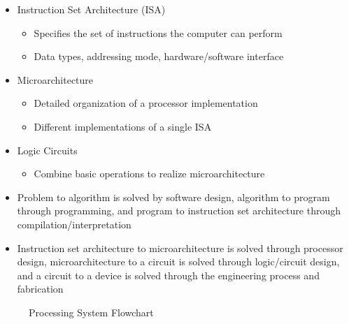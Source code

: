 \begin{itemize}
\begin{itemize}
\begin{itemize}
        \end{itemize}

      \item Instruction Set Architecture (ISA)

        \begin{itemize}

          \item Specifies the set of instructions the computer can perform

          \item Data types, addressing mode, hardware/software interface

        \end{itemize}

      \item Microarchitecture

        \begin{itemize}

          \item Detailed organization of a processor implementation

          \item Different implementations of a single ISA

        \end{itemize}

      \item Logic Circuits

        \begin{itemize}

          \item Combine basic operations to realize microarchitecture

        \end{itemize}

      \item Problem to algorithm is solved by software design, algorithm to program through programming, and program to instruction set architecture through compilation/interpretation

      \item Instruction set architecture to microarchitecture is solved through processor design, microarchitecture to a circuit is solved through logic/circuit design, and a circuit to a device is solved through the engineering process and fabrication

    \end{itemize}

    \begin{figure}[h!]
      \centering
      
      \caption{Processing System Flowchart}
      \label{fig:1}
    \end{figure}


\end{itemize}
